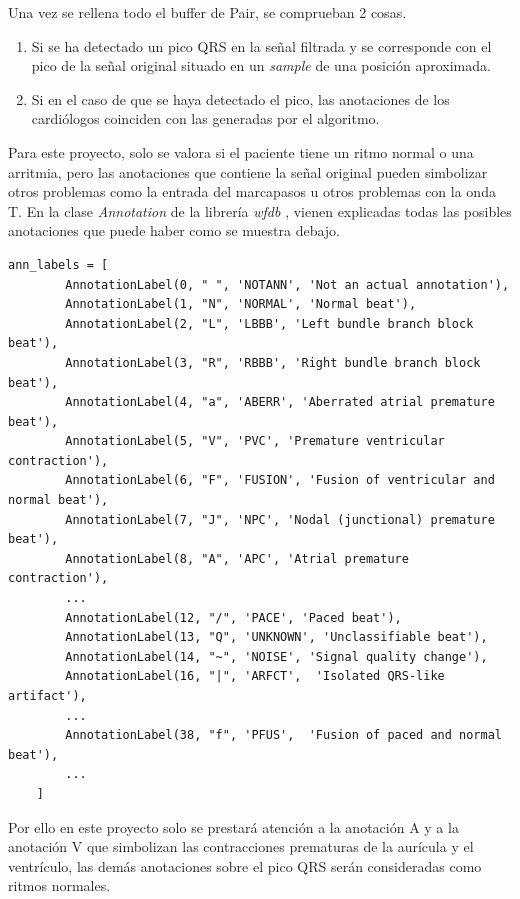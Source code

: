 Una vez se rellena todo el buffer de Pair, se comprueban 2 cosas.
\begin{enumerate}
	\item Si se ha detectado un pico QRS en la señal filtrada y se
     corresponde con el pico de la señal original situado en un \textit{sample} de una posición aproximada.
	\item Si en el caso de que se haya detectado el pico, las anotaciones de los cardiólogos coinciden
     con las generadas por el algoritmo.
\end{enumerate} 

Para este proyecto, solo se valora si el paciente tiene un ritmo normal o una arritmia, pero las anotaciones que contiene la señal original pueden simbolizar otros problemas como la entrada del marcapasos u otros problemas con la onda T.
En la clase \textit{Annotation} de la librería \textit{wfdb} \cite{WFDB}, vienen explicadas todas las posibles anotaciones que puede haber como se muestra debajo.
\newpage
\lstset{language=python, breaklines=true, basicstyle=\footnotesize}
\begin{lstlisting}[frame=single]
    ann_labels = [
        AnnotationLabel(0, " ", 'NOTANN', 'Not an actual annotation'),
        AnnotationLabel(1, "N", 'NORMAL', 'Normal beat'),
        AnnotationLabel(2, "L", 'LBBB', 'Left bundle branch block beat'),
        AnnotationLabel(3, "R", 'RBBB', 'Right bundle branch block beat'),
        AnnotationLabel(4, "a", 'ABERR', 'Aberrated atrial premature beat'),
        AnnotationLabel(5, "V", 'PVC', 'Premature ventricular contraction'),
        AnnotationLabel(6, "F", 'FUSION', 'Fusion of ventricular and normal beat'),
        AnnotationLabel(7, "J", 'NPC', 'Nodal (junctional) premature beat'),
        AnnotationLabel(8, "A", 'APC', 'Atrial premature contraction'),
        ...
        AnnotationLabel(12, "/", 'PACE', 'Paced beat'),
        AnnotationLabel(13, "Q", 'UNKNOWN', 'Unclassifiable beat'),
        AnnotationLabel(14, "~", 'NOISE', 'Signal quality change'),
        AnnotationLabel(16, "|", 'ARFCT',  'Isolated QRS-like artifact'),
        ...
        AnnotationLabel(38, "f", 'PFUS',  'Fusion of paced and normal beat'),
        ...
    ]
\end{lstlisting}

Por ello en este proyecto solo se prestará atención a la anotación A y a la anotación V que simbolizan 
las contracciones prematuras de la aurícula y el ventrículo, las demás anotaciones sobre el pico QRS serán 
consideradas como ritmos normales.


